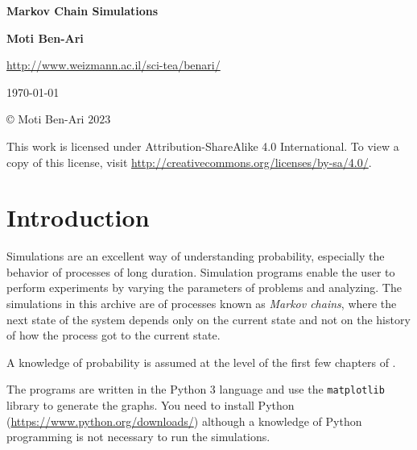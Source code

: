 \documentclass[11pt,a4paper]{article}
\begin{document}

\thispagestyle{empty}

\begin{center}
\textbf{\LARGE Markov Chain Simulations}

\bigskip
\bigskip
\bigskip

\textbf{\Large Moti Ben-Ari}

\bigskip

\url{http://www.weizmann.ac.il/sci-tea/benari/}

\bigskip
\bigskip
\bigskip

\today

\end{center}

\vfill

\begin{center}
\copyright{} Moti Ben-Ari $2023$
 \end{center}
 
\begin{small}
This work is licensed under Attribution-ShareAlike 4.0 International. To view a copy of this license, visit \url{http://creativecommons.org/licenses/by-sa/4.0/}.
\end{small}
\newpage

\tableofcontents

\newpage



\section{Introduction}

Simulations are an excellent way of understanding probability, especially the behavior of processes of long duration. Simulation programs enable the user to perform experiments by varying the parameters of problems and analyzing. The simulations in this archive are of processes known as \emph{Markov chains}, where the next state of the system depends only on the current state and not on the history of how the process got to the current state. 

A knowledge of probability is assumed at the level of the first few chapters of \cite{BW,ross}. 

\nocite{*}

The programs are written in the Python 3 language and use the \verb+matplotlib+ library to generate the graphs. You need to install Python (\url{https://www.python.org/downloads/}) although a knowledge of Python programming is not necessary to run the simulations.
\end{document}
